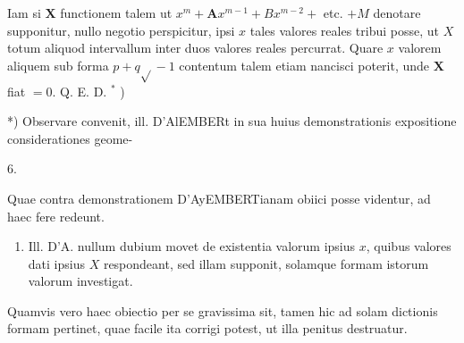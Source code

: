 \documentclass[twoside,12pt, showframe]{memoir}
\begin{document}
Iam si \(\boldsymbol{X}\) functionem talem ut \(x^{m}+\boldsymbol{A} x^{m-1}+B x^{m-2}+\) etc. \(+M\) denotare supponitur, nullo negotio perspicitur, ipsi \(x\) tales valores reales tribui posse, ut \(X\) totum aliquod intervallum inter duos valores reales percurrat. Quare \(x\) valorem aliquem sub forma \(p+q \sqrt{ }-1\) contentum talem etiam nancisci poterit, unde \(\boldsymbol{X}\) fiat \(=0\). Q. E. D. \({ }^{*}\) )

*) Observare convenit, ill. D'AlEMBERt in sua huius demonstrationis expositione considerationes geome-

6.

Quae contra demonstrationem D'AyEMBERTianam obiici posse videntur, ad haec fere redeunt.

\begin{enumerate}
  \item Ill. D'A. nullum dubium movet de existentia valorum ipsius \(x\), quibus valores dati ipsius \(X\) respondeant, sed illam supponit, solamque formam istorum valorum investigat.
\end{enumerate}

Quamvis vero haec obiectio per se gravissima sit, tamen hic ad solam dictionis formam pertinet, quae facile ita corrigi potest, ut illa penitus destruatur.
\end{document}
